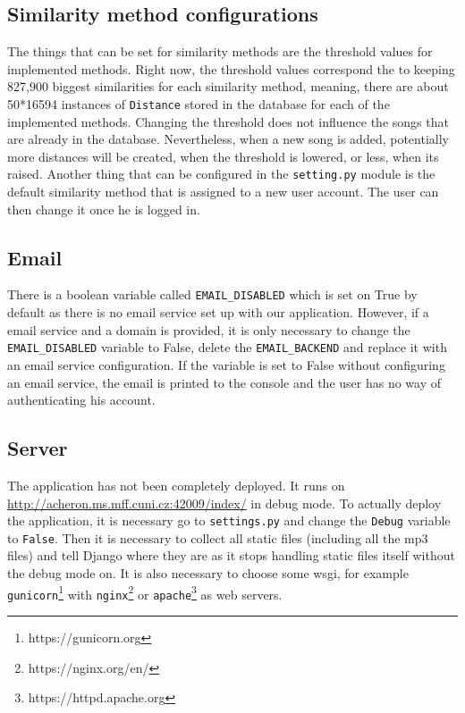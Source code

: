 \subsection{Similarity method configurations}
The things that can be set for similarity methods are the threshold values for implemented methods. Right now, the threshold values correspond the to keeping 827,900 biggest similarities for each similarity method, meaning, there are about 50*16594 instances of \texttt{Distance} stored in the database for each of the implemented methods. Changing the threshold does not influence the songs that are already in the database. Nevertheless, when a new song is added, potentially more distances will be created, when the threshold is lowered, or less, when its raised. 
Another thing that can be configured in the \texttt{setting.py} module is the default similarity method that is assigned to a new user account. The user can then change it once he is logged in.

\subsection{Email}
There is a boolean variable called \texttt{EMAIL\_DISABLED} which is set on True by default as there is no email service set up with our application. However, if a email service and a domain is provided, it is only necessary to change the \texttt{EMAIL\_DISABLED} variable to False, delete the \texttt{EMAIL\_BACKEND} and replace it with an email service configuration. If the variable is set to False without configuring an email service, the email is printed to the console and the user has no way of authenticating his account.

\subsection{Server}

The application has not been completely deployed. It runs on \url{http://acheron.ms.mff.cuni.cz:42009/index/} in debug mode. To actually deploy the application, it is necessary go to \texttt{settings.py} and change the \texttt{Debug} variable to \texttt{False}. Then it is necessary to collect all static files (including all the mp3 files) and tell Django where they are as it stops handling static files itself without the debug mode on. It is also necessary to choose some wsgi, for example \texttt{gunicorn}\footnote{https://gunicorn.org} with \texttt{nginx}\footnote{https://nginx.org/en/} or \texttt{apache}\footnote{https://httpd.apache.org} as web servers. 





